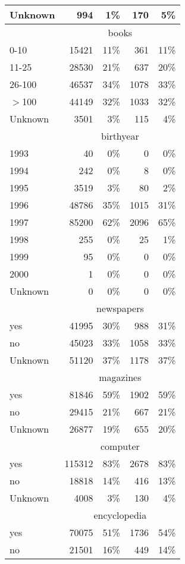 \begin{longtable}{lrrrr}
  Unknown & 994 & 1\% & 170 & 5\% \\ 
   \hline & \multicolumn{4}{c}{books} \\ \cline{2-5} 0-10 & 15421 & 11\% & 361 & 11\% \\ 
  11-25 & 28530 & 21\% & 637 & 20\% \\ 
  26-100 & 46537 & 34\% & 1078 & 33\% \\ 
  $>$100 & 44149 & 32\% & 1033 & 32\% \\ 
  Unknown & 3501 & 3\% & 115 & 4\% \\ 
   \hline & \multicolumn{4}{c}{birthyear} \\ \cline{2-5} 1993 &  40 & 0\% &   0 & 0\% \\ 
  1994 & 242 & 0\% &   8 & 0\% \\ 
  1995 & 3519 & 3\% &  80 & 2\% \\ 
  1996 & 48786 & 35\% & 1015 & 31\% \\ 
  1997 & 85200 & 62\% & 2096 & 65\% \\ 
  1998 & 255 & 0\% &  25 & 1\% \\ 
  1999 &  95 & 0\% &   0 & 0\% \\ 
  2000 &   1 & 0\% &   0 & 0\% \\ 
  Unknown &   0 & 0\% &   0 & 0\% \\ 
   \hline & \multicolumn{4}{c}{newspapers} \\ \cline{2-5} yes & 41995 & 30\% & 988 & 31\% \\ 
  no & 45023 & 33\% & 1058 & 33\% \\ 
  Unknown & 51120 & 37\% & 1178 & 37\% \\ 
   \hline & \multicolumn{4}{c}{magazines} \\ \cline{2-5} yes & 81846 & 59\% & 1902 & 59\% \\ 
  no & 29415 & 21\% & 667 & 21\% \\ 
  Unknown & 26877 & 19\% & 655 & 20\% \\ 
   \hline & \multicolumn{4}{c}{computer} \\ \cline{2-5} yes & 115312 & 83\% & 2678 & 83\% \\ 
  no & 18818 & 14\% & 416 & 13\% \\ 
  Unknown & 4008 & 3\% & 130 & 4\% \\ 
   \hline & \multicolumn{4}{c}{encyclopedia} \\ \cline{2-5} yes & 70075 & 51\% & 1736 & 54\% \\ 
  no & 21501 & 16\% & 449 & 14\% \\ 

\end{longtable}
